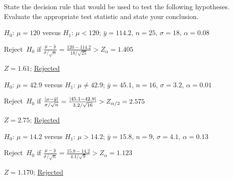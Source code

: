 \begin{problem}
   State the decision rule that would be used to test the following hypotheses.  Evaluate the appropriate test statistic and state your conclusion.
\end{problem}

\begin{subproblem}
  $H_0$: ${\mu = 120}$ versus $H_1$: ${\mu < 120}$; ${\bar{y} = 114.2}$, ${n = 25}$, ${\sigma = 18}$, ${\alpha = 0.08}$
\end{subproblem}

\noindent
Reject~$H_0$ if ${\frac{\mu - \bar{y}}{\sigma / \sqrt{n}} = \frac{120 - 114.2}{18 / \sqrt{25}} > Z_{\alpha} = 1.405}$

\noindent
${Z = 1.61}$; \underline{Rejected}

\begin{subproblem}
  $H_0$: ${\mu = 42.9}$ versus $H_1$: ${\mu \ne 42.9}$; ${\bar{y} = 45.1}$, ${n = 16}$, ${\sigma = 3.2}$, ${\alpha = 0.01}$
\end{subproblem}

\noindent
Reject~$H_0$ if ${\frac{\lvert\mu - \bar{y}\rvert}{\sigma / \sqrt{n}} = \frac{\lvert45.1 - 42.9\rvert}{3.2 / \sqrt{16}} > Z_{\alpha/2} = 2.575}$

\noindent
${Z = 2.75}$; \underline{Rejected}

\begin{subproblem}
  $H_0$: ${\mu = 14.2}$ versus $H_1$: ${\mu > 14.2}$; ${\bar{y} = 15.8}$, ${n = 9}$, ${\sigma = 4.1}$, ${\alpha = 0.13}$
\end{subproblem}

\noindent
Reject~$H_0$ if ${\frac{\mu - \bar{y}}{\sigma / \sqrt{n}} = \frac{15.8 - 14.2}{4.1 / \sqrt{9}} > Z_{\alpha} = 1.123}$

\noindent
${Z = 1.170}$; \underline{Rejected}
